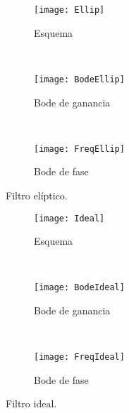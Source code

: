 \begin{figure}[h]
    \centering
    \begin{subfigure}[t]{0.32\textwidth}
        \texttt{[image: Ellip]}
        \caption{Esquema}
        \label{subfig:filtroellip_diagrama}
    \end{subfigure}
    ~ %
    \begin{subfigure}[t]{0.32\textwidth}
        \texttt{[image: BodeEllip]}
        \caption{Bode de ganancia}
        \label{subfig:filtroellip_amplitud}
    \end{subfigure}
    ~ %
    \begin{subfigure}[t]{0.32\textwidth}
        \texttt{[image: FreqEllip]}
        \caption{Bode de fase}
        \label{subfig:filtroellip_frecuencia}
    \end{subfigure}
    \caption{Filtro elíptico.}\label{fig:filtroellip}
\end{figure}

\begin{figure}[h]
    \centering
    \begin{subfigure}[t]{0.32\textwidth}
        \texttt{[image: Ideal]}
        \caption{Esquema}
        \label{subfig:filtroideal_diagrama}
    \end{subfigure}
    ~ %
    \begin{subfigure}[t]{0.32\textwidth}
        \texttt{[image: BodeIdeal]}
        \caption{Bode de ganancia}
        \label{subfig:filtroideal_amplitud}
    \end{subfigure}
    ~ %
    \begin{subfigure}[t]{0.32\textwidth}
        \texttt{[image: FreqIdeal]}
        \caption{Bode de fase}
        \label{subfig:filtroideal_frecuencia}
    \end{subfigure}
    \caption{Filtro ideal.}\label{fig:filtroideal}
\end{figure}

